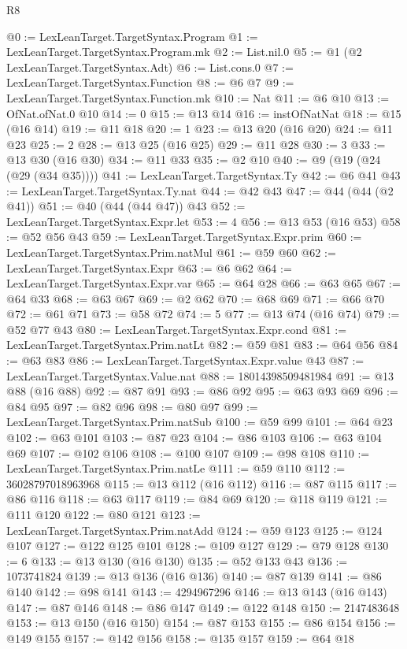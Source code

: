 \begin{lexlean}{R8}
\begin{coremodule}
@0 := LexLeanTarget.TargetSyntax.Program
@1 := LexLeanTarget.TargetSyntax.Program.mk
@2 := List.nil.{0}
@5 := @1 (@2 LexLeanTarget.TargetSyntax.Adt)
@6 := List.cons.{0}
@7 := LexLeanTarget.TargetSyntax.Function
@8 := @6 @7
@9 := LexLeanTarget.TargetSyntax.Function.mk
@10 := Nat
@11 := @6 @10
@13 := OfNat.ofNat.{0} @10
@14 := 0
@15 := @13 @14
@16 := instOfNatNat
@18 := @15 (@16 @14)
@19 := @11 @18
@20 := 1
@23 := @13 @20 (@16 @20)
@24 := @11 @23
@25 := 2
@28 := @13 @25 (@16 @25)
@29 := @11 @28
@30 := 3
@33 := @13 @30 (@16 @30)
@34 := @11 @33
@35 := @2 @10
@40 := @9 (@19 (@24 (@29 (@34 @35))))
@41 := LexLeanTarget.TargetSyntax.Ty
@42 := @6 @41
@43 := LexLeanTarget.TargetSyntax.Ty.nat
@44 := @42 @43
@47 := @44 (@44 (@2 @41))
@51 := @40 (@44 (@44 @47)) @43
@52 := LexLeanTarget.TargetSyntax.Expr.let
@53 := 4
@56 := @13 @53 (@16 @53)
@58 := @52 @56 @43
@59 := LexLeanTarget.TargetSyntax.Expr.prim
@60 := LexLeanTarget.TargetSyntax.Prim.natMul
@61 := @59 @60
@62 := LexLeanTarget.TargetSyntax.Expr
@63 := @6 @62
@64 := LexLeanTarget.TargetSyntax.Expr.var
@65 := @64 @28
@66 := @63 @65
@67 := @64 @33
@68 := @63 @67
@69 := @2 @62
@70 := @68 @69
@71 := @66 @70
@72 := @61 @71
@73 := @58 @72
@74 := 5
@77 := @13 @74 (@16 @74)
@79 := @52 @77 @43
@80 := LexLeanTarget.TargetSyntax.Expr.cond
@81 := LexLeanTarget.TargetSyntax.Prim.natLt
@82 := @59 @81
@83 := @64 @56
@84 := @63 @83
@86 := LexLeanTarget.TargetSyntax.Expr.value @43
@87 := LexLeanTarget.TargetSyntax.Value.nat
@88 := 18014398509481984
@91 := @13 @88 (@16 @88)
@92 := @87 @91
@93 := @86 @92
@95 := @63 @93 @69
@96 := @84 @95
@97 := @82 @96
@98 := @80 @97
@99 := LexLeanTarget.TargetSyntax.Prim.natSub
@100 := @59 @99
@101 := @64 @23
@102 := @63 @101
@103 := @87 @23
@104 := @86 @103
@106 := @63 @104 @69
@107 := @102 @106
@108 := @100 @107
@109 := @98 @108
@110 := LexLeanTarget.TargetSyntax.Prim.natLe
@111 := @59 @110
@112 := 36028797018963968
@115 := @13 @112 (@16 @112)
@116 := @87 @115
@117 := @86 @116
@118 := @63 @117
@119 := @84 @69
@120 := @118 @119
@121 := @111 @120
@122 := @80 @121
@123 := LexLeanTarget.TargetSyntax.Prim.natAdd
@124 := @59 @123
@125 := @124 @107
@127 := @122 @125 @101
@128 := @109 @127
@129 := @79 @128
@130 := 6
@133 := @13 @130 (@16 @130)
@135 := @52 @133 @43
@136 := 1073741824
@139 := @13 @136 (@16 @136)
@140 := @87 @139
@141 := @86 @140
@142 := @98 @141
@143 := 4294967296
@146 := @13 @143 (@16 @143)
@147 := @87 @146
@148 := @86 @147
@149 := @122 @148
@150 := 2147483648
@153 := @13 @150 (@16 @150)
@154 := @87 @153
@155 := @86 @154
@156 := @149 @155
@157 := @142 @156
@158 := @135 @157
@159 := @64 @18

\end{coremodule}
\end{lexlean}
